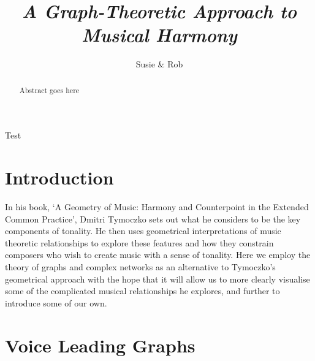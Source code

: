\documentclass[]{tMAM2e}
\begin{document}
  

    



\title{{\itshape A Graph-Theoretic Approach to Musical Harmony}}

\author{Susie \& Rob }



\maketitle

\begin{abstract}
Abstract goes here
\end{abstract}

Test

\section{Introduction}

In his book, `A Geometry of Music: Harmony and Counterpoint in the Extended Common Practice'\cite{tymoczko2011geometry}, Dmitri Tymoczko sets out what he considers to be the key components of tonality. He then uses geometrical interpretations of music theoretic relationships to explore these features and how they constrain composers who wish to create music with a sense of tonality. Here we employ the theory of graphs and complex networks as an alternative to Tymoczko's geometrical approach with the hope that it will allow us to more clearly visualise some of the complicated musical relationships he explores, and further to introduce some of our own.


\section{Voice Leading Graphs}
\end{document}
